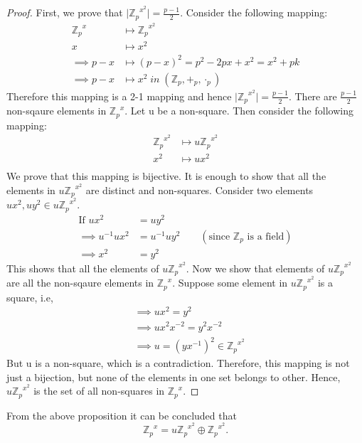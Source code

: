 \documentclass[10pt,a4paper]{article}
\begin{document}
\begin{proof}
First, we prove that $\vert {\mathbb{Z}_p}^{x^2}\vert=\frac{p-1}{2}$. Consider the following mapping:
\begin{align*}
{\mathbb{Z}_p}^{x} &\mapsto {\mathbb{Z}_p}^{x^2} \\
x &\mapsto x^2 \\
\implies p-x &\mapsto (p-x)^2 = p^2-2px+x^2 = x^2 + pk \\
\implies p-x &\mapsto x^2\;in\;(\mathbb{Z}_p,+_p,\cdot_p)
\end{align*}
Therefore this mapping is a 2-1 mapping and hence $\vert {\mathbb{Z}_p}^{x^2}\vert=\frac{p-1}{2}$. There are $\frac{p-1}{2}$ non-sqaure elements in ${\mathbb{Z}_p}^x$. Let u be a non-square. Then consider the following mapping:
\begin{align*}
{\mathbb{Z}_p}^{x^2} &\mapsto u{\mathbb{Z}_p}^{x^2} \\
x^2 &\mapsto ux^2 \\
\end{align*}
We prove that this mapping is bijective. It is enough to show that all the elements in $u{\mathbb{Z}_p}^{x^2}$ are distinct and non-squares. Consider two elements $ux^2,uy^2\in u{\mathbb{Z}_p}^{x^2}$.
\begin{align*}
\text{If }ux^2&=uy^2 \\
\implies u^{-1}ux^2&=u^{-1}uy^2 \qquad(\text{since }\mathbb{Z}_p\text{ is a field})\\
\implies x^2&=y^2
\end{align*}
This shows that all the elements of $u{\mathbb{Z}_p}^{x^2}$. Now we show that elements of $u{\mathbb{Z}_p}^{x^2}$ are all the non-sqaure elements in ${\mathbb{Z}_p}^{x}$. Suppose some element in $u{\mathbb{Z}_p}^{x^2}$ is a square, i.e,
\begin{align*}
&\implies ux^2=y^2 \\
&\implies ux^2x^{-2}=y^2x^{-2} \\
&\implies u=(yx^{-1})^2 \in {\mathbb{Z}_p}^{x^2}
\end{align*}
But u is a non-square, which is a contradiction. Therefore, this mapping is not just a bijection, but none of the elements in one set belongs to other. Hence, $u{\mathbb{Z}_p}^{x^2}$ is the set of all non-squares in ${\mathbb{Z}_p}^x$.
\end{proof}

\begin{remark}
From the above proposition it can be concluded that $${\mathbb{Z}_p}^x=u{\mathbb{Z}_p}^{x^2}\oplus {\mathbb{Z}_p}^{x^2}.$$
\end{remark}
\end{document}
